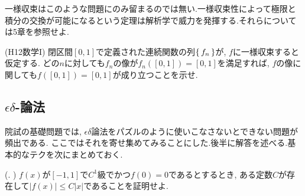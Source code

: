 一様収束はこのような問題にのみ留まるのでは無い.一様収束性によって極限と積分の交換が可能になるという定理は解析学で威力を発揮する.それらについては5章を参照せよ.

\begin{egprob} (H12数学I)
閉区間$[0,1]$で定義された連続関数の列$\set{f_n}$が, $f$に一様収束すると仮定する. どの$n$に対しても$f_n$の像が$f_n([0,1]) = [0,1]$を満足すれば, $f$の像に関しても$f([0,1]) = [0,1]$が成り立つことを示せ.
\end{egprob}

















\newpage
\subsection{$\epsilon\delta$-論法}
院試の基礎問題では,
$\epsilon\delta$論法をパズルのように使いこなさないとできない問題が頻出である. ここではそれを寄せ集めてみることにした.後半に解答を述べる.基本的なテクを次にまとめておく.

\begin{prac} (. )
$f(x)$が$[-1,1]$で$C^1$級でかつ$f(0) = 0$であるとするとき, ある定数$C$が存在して$|f(x)|\leq C|x|$であることを証明せよ.
\end{prac}


